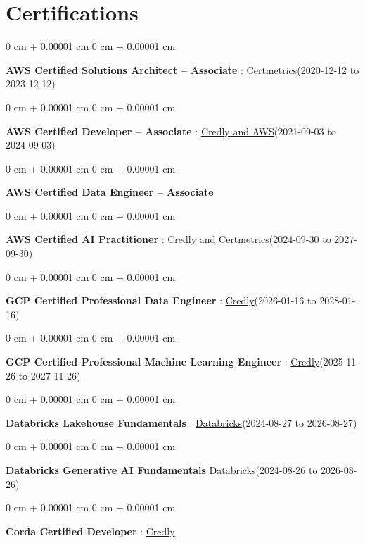 \documentclass[10pt, letterpaper]{article}
\newenvironment{onecolentry}{
    \begin{adjustwidth}{
        0 cm + 0.00001 cm
    }{
        0 cm + 0.00001 cm
    }
}{
    \end{adjustwidth}
} %
\begin{document}
    \vspace{2 pt }
    \section{Certifications}
        \vspace{2 pt }
        \begin{samepage}
            \begin{onecolentry}
                \textbf{AWS Certified Solutions Architect – Associate} : \href{https://cp.certmetrics.com/amazon/en/public/verify/credential/SNBY48EBJJVE1SWX}{Certmetrics}(2020-12-12 to 2023-12-12)
            \end{onecolentry}
            \begin{onecolentry}
                \textbf{AWS Certified Developer – Associate} : \href{https://www.credly.com/badges/b8106fbd-d3d1-4204-8cdf-e708798fd582/public_url}{Credly and AWS}(2021-09-03  to 2024-09-03)
            \end{onecolentry}
            \begin{onecolentry}
                \textbf{AWS Certified Data Engineer – Associate}
            \end{onecolentry}
            \begin{onecolentry}
                \textbf{AWS Certified AI Practitioner} : \href{https://www.credly.com/badges/451b7ba5-8be1-4a8e-bbec-ade26627a6b6/public_url}{Credly} and \href{https://cp.certmetrics.com/amazon/en/public/verify/credential/495f0d9853874bf9a33c17f8e89ce131}{Certmetrics}(2024-09-30 to 2027-09-30)
            \end{onecolentry}
            \begin{onecolentry}
                \textbf{GCP Certified Professional Data Engineer} : \href{https://www.credly.com/badges/977e96d9-12e7-4f6c-b8a7-df71fb7153b8/public_url}{Credly}(2026-01-16 to 2028-01-16)
            \end{onecolentry}
            \begin{onecolentry}
                \textbf{GCP Certified Professional Machine Learning Engineer} : \href{https://www.credly.com/badges/a6965347-09ea-4d8f-b398-0e151407160d/public_url}{Credly}(2025-11-26 to 2027-11-26)
            \end{onecolentry}
            \begin{onecolentry}
                \textbf{Databricks Lakehouse Fundamentals} : \href{https://scl.io/FXGKS0u}{Databricks}(2024-08-27 to 2026-08-27)
            \end{onecolentry}
            \begin{onecolentry}
                \textbf{Databricks Generative AI Fundamentals} \href{https://sgq.io/3uIFGNi}{Databricks}(2024-08-26 to 2026-08-26)
            \end{onecolentry}
            \begin{onecolentry}
                \textbf{Corda Certified Developer} : \href{https://www.credly.com/badges/7f29d39c-34b6-4de9-b07d-e10f1090a335/linked_in_profile}{Credly}
            \end{onecolentry}
        \end{samepage}
\end{document}
